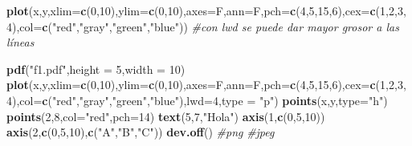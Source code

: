 \documentclass[
]{book}
\newenvironment{Shaded}{\begin{snugshade}}{\end{snugshade}}
\newcommand{\CommentTok}[1]{\textcolor[rgb]{0.56,0.35,0.01}{\textit{#1}}}
\newcommand{\DataTypeTok}[1]{\textcolor[rgb]{0.13,0.29,0.53}{#1}}
\newcommand{\DecValTok}[1]{\textcolor[rgb]{0.00,0.00,0.81}{#1}}
\newcommand{\KeywordTok}[1]{\textcolor[rgb]{0.13,0.29,0.53}{\textbf{#1}}}
\newcommand{\NormalTok}[1]{#1}
\newcommand{\StringTok}[1]{\textcolor[rgb]{0.31,0.60,0.02}{#1}}
\begin{document}
\begin{Shaded}
\begin{Highlighting}[]
\KeywordTok{plot}\NormalTok{(x,y,}\DataTypeTok{xlim=}\KeywordTok{c}\NormalTok{(}\DecValTok{0}\NormalTok{,}\DecValTok{10}\NormalTok{),}\DataTypeTok{ylim=}\KeywordTok{c}\NormalTok{(}\DecValTok{0}\NormalTok{,}\DecValTok{10}\NormalTok{),}\DataTypeTok{axes=}\NormalTok{F,}\DataTypeTok{ann=}\NormalTok{F,}\DataTypeTok{pch=}\KeywordTok{c}\NormalTok{(}\DecValTok{4}\NormalTok{,}\DecValTok{5}\NormalTok{,}\DecValTok{15}\NormalTok{,}\DecValTok{6}\NormalTok{),}\DataTypeTok{cex=}\KeywordTok{c}\NormalTok{(}\DecValTok{1}\NormalTok{,}\DecValTok{2}\NormalTok{,}\DecValTok{3}\NormalTok{,}\DecValTok{4}\NormalTok{),}\DataTypeTok{col=}\KeywordTok{c}\NormalTok{(}\StringTok{"red"}\NormalTok{,}\StringTok{"gray"}\NormalTok{,}\StringTok{"green"}\NormalTok{,}\StringTok{"blue"}\NormalTok{))}
\CommentTok{#con lwd se puede dar mayor grosor a las líneas}

\KeywordTok{pdf}\NormalTok{(}\StringTok{"f1.pdf"}\NormalTok{,}\DataTypeTok{height =} \DecValTok{5}\NormalTok{,}\DataTypeTok{width =} \DecValTok{10}\NormalTok{)}
\KeywordTok{plot}\NormalTok{(x,y,}\DataTypeTok{xlim=}\KeywordTok{c}\NormalTok{(}\DecValTok{0}\NormalTok{,}\DecValTok{10}\NormalTok{),}\DataTypeTok{ylim=}\KeywordTok{c}\NormalTok{(}\DecValTok{0}\NormalTok{,}\DecValTok{10}\NormalTok{),}\DataTypeTok{axes=}\NormalTok{F,}\DataTypeTok{ann=}\NormalTok{F,}\DataTypeTok{pch=}\KeywordTok{c}\NormalTok{(}\DecValTok{4}\NormalTok{,}\DecValTok{5}\NormalTok{,}\DecValTok{15}\NormalTok{,}\DecValTok{6}\NormalTok{),}\DataTypeTok{cex=}\KeywordTok{c}\NormalTok{(}\DecValTok{1}\NormalTok{,}\DecValTok{2}\NormalTok{,}\DecValTok{3}\NormalTok{,}\DecValTok{4}\NormalTok{),}\DataTypeTok{col=}\KeywordTok{c}\NormalTok{(}\StringTok{"red"}\NormalTok{,}\StringTok{"gray"}\NormalTok{,}\StringTok{"green"}\NormalTok{,}\StringTok{"blue"}\NormalTok{),}\DataTypeTok{lwd=}\DecValTok{4}\NormalTok{,}\DataTypeTok{type =} \StringTok{"p"}\NormalTok{)}
\KeywordTok{points}\NormalTok{(x,y,}\DataTypeTok{type=}\StringTok{"h"}\NormalTok{)}
\KeywordTok{points}\NormalTok{(}\DecValTok{2}\NormalTok{,}\DecValTok{8}\NormalTok{,}\DataTypeTok{col=}\StringTok{"red"}\NormalTok{,}\DataTypeTok{pch=}\DecValTok{14}\NormalTok{)}
\KeywordTok{text}\NormalTok{(}\DecValTok{5}\NormalTok{,}\DecValTok{7}\NormalTok{,}\StringTok{"Hola"}\NormalTok{)}
\KeywordTok{axis}\NormalTok{(}\DecValTok{1}\NormalTok{,}\KeywordTok{c}\NormalTok{(}\DecValTok{0}\NormalTok{,}\DecValTok{5}\NormalTok{,}\DecValTok{10}\NormalTok{))}
\KeywordTok{axis}\NormalTok{(}\DecValTok{2}\NormalTok{,}\KeywordTok{c}\NormalTok{(}\DecValTok{0}\NormalTok{,}\DecValTok{5}\NormalTok{,}\DecValTok{10}\NormalTok{),}\KeywordTok{c}\NormalTok{(}\StringTok{"A"}\NormalTok{,}\StringTok{"B"}\NormalTok{,}\StringTok{"C"}\NormalTok{))}
\KeywordTok{dev.off}\NormalTok{()}
\CommentTok{#png}
\CommentTok{#jpeg}
\end{Highlighting}
\end{Shaded}
\end{document}
